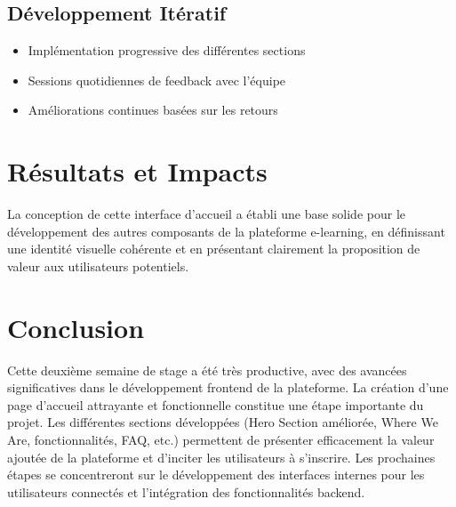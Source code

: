 \subsection{Développement Itératif}
\begin{itemize}
  \item Implémentation progressive des différentes sections
  \item Sessions quotidiennes de feedback avec l'équipe
  \item Améliorations continues basées sur les retours
\end{itemize}

\section{Résultats et Impacts}

La conception de cette interface d'accueil a établi une base solide pour le développement des autres composants de la plateforme e-learning, en définissant une identité visuelle cohérente et en présentant clairement la proposition de valeur aux utilisateurs potentiels. 

\section{Conclusion}

Cette deuxième semaine de stage a été très productive, avec des avancées significatives dans le développement frontend de la plateforme. La création d'une page d'accueil attrayante et fonctionnelle constitue une étape importante du projet. Les différentes sections développées (Hero Section améliorée, Where We Are, fonctionnalités, FAQ, etc.) permettent de présenter efficacement la valeur ajoutée de la plateforme et d'inciter les utilisateurs à s'inscrire. Les prochaines étapes se concentreront sur le développement des interfaces internes pour les utilisateurs connectés et l'intégration des fonctionnalités backend. 